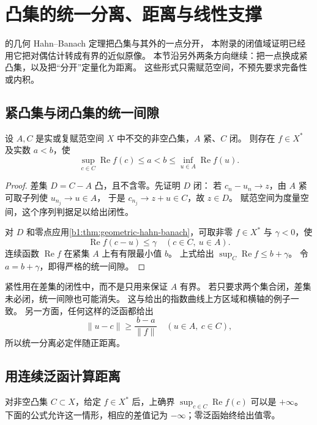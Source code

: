 \section{凸集的统一分离、距离与线性支撑}
\label{b1:sec:C106}

的几何 Hahn--Banach 定理把凸集与其外的一点分开，
本附录的闭值域证明已经用它把对偶估计转成有界的近似原像。
本节沿另外两条方向继续：把一点换成紧凸集，以及把“分开”定量化为距离。
这些形式只需赋范空间，不预先要求完备性或内积。

\subsection{紧凸集与闭凸集的统一间隙}
\label{b1:subsec:C10601}

\begin{theorem}
\label{b1:thm:C1-compact-closed-separation}
设 \(A,C\) 是实或复赋范空间 \(X\) 中不交的非空凸集，\(A\) 紧、\(C\) 闭。
则存在 \(f\in X^*\) 及实数 \(a<b\)，使
\[
 \sup_{c\in C}\operatorname{Re}f(c)\leq a
 <b\leq\inf_{u\in A}\operatorname{Re}f(u).
\]
\end{theorem}
\begin{proof}
差集 \(D=C-A\) 凸，且不含零。先证明 \(D\) 闭：
若 \(c_n-u_n\to z\)，由 \(A\) 紧可取子列使 \(u_{n_j}\to u\in A\)，
于是 \(c_{n_j}\to z+u\in C\)，故 \(z\in D\)。
赋范空间为度量空间，这个序列判据足以给出闭性。

对 \(D\) 和零点应用\cref{b1:thm:geometric-hahn-banach}，可取非零 \(f\in X^*\) 与
\(\gamma<0\)，使
\[
 \operatorname{Re}f(c-u)\leq\gamma\quad(c\in C,\ u\in A).
\]
连续函数 \(\operatorname{Re}f\) 在紧集 \(A\) 上有有限最小值 \(b\)。
上式给出 \(\sup_C\operatorname{Re}f\leq b+\gamma\)。
令 \(a=b+\gamma\)，即得严格的统一间隙。
\end{proof}

紧性用在差集的闭性中，而不是只用来保证 \(A\) 有界。
若只要求两个集合闭，差集未必闭，统一间隙也可能消失。
这与给出的指数曲线上方区域和横轴的例子一致。
另一方面，任何这样的泛函都给出
\[
 \|u-c\|\geq\frac{b-a}{\|f\|}\quad(u\in A,\ c\in C),
\]
所以统一分离必定伴随正距离。

\subsection{用连续泛函计算距离}
\label{b1:subsec:C10602}

对非空凸集 \(C\subset X\)，给定 \(f\in X^*\) 后，上确界
\(\sup_{c\in C}\operatorname{Re}f(c)\) 可以是 \(+\infty\)。
下面的公式允许这一情形，相应的差值记为 \(-\infty\)；零泛函始终给出值零。

